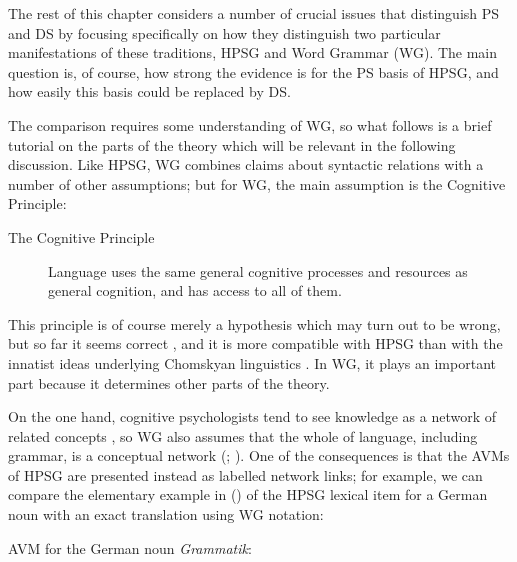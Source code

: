 \documentclass[output=paper]{langscibook}
\begin{document}
The rest of this chapter considers a number of crucial issues that distinguish PS and DS by focusing specifically on how they distinguish two particular manifestations of these traditions, HPSG and Word Grammar (WG). The main question is, of course, how strong the evidence is for the PS basis of HPSG, and how easily this basis could be replaced by DS.

The comparison requires some understanding of WG, so what follows is a brief tutorial on the parts of the theory which will be relevant in the following discussion. Like HPSG, WG combines claims about syntactic relations with a number of other assumptions; but for WG, the main assumption is the Cognitive Principle:

\begin{description}
	\item[The Cognitive Principle] \label{it:CogPrin}Language uses the same general cognitive processes and resources as general cognition, and has access to all of them.
\end{description}

This principle is of course merely a hypothesis which may turn out to be wrong, but so far it seems correct \citep[494]{MuellerGT-Eng2}, and it is more compatible with HPSG than with the innatist ideas underlying Chomskyan linguistics \citep{Berwick&co2013}. In WG, it plays an important part because it determines other parts of the theory.

On the one hand, cognitive psychologists tend to see knowledge as a network of related concepts \citep[252]{Reisberg2007}, so WG also assumes that the whole of language, including grammar, is a conceptual network (\citealt[1]{Hudson84a-u}; \citeyear[1]{Hudson2007a-u}). One of the consequences is that the AVMs of HPSG are presented instead as labelled network links; for example, we can compare the elementary example in () of the HPSG lexical item for a German noun \citep[264]{MuellerGT-Eng2} with an exact translation using WG notation:

\ea
\label{fig:5}
AVM for the German noun \emph{Grammatik}:\\
\z
\end{document}
